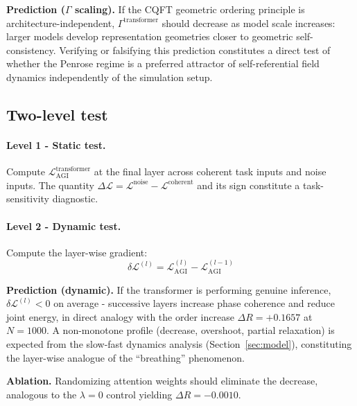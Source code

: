 \documentclass[12pt,a4paper]{article}
\theoremstyle{plain}
\theoremstyle{definition}
\begin{document}
\begin{keyresult}
\textbf{Prediction ($\Gamma$ scaling).} If the CQFT geometric ordering
principle is architecture-independent, $\Gamma^{\text{transformer}}$
should decrease as model scale increases: larger models develop
representation geometries closer to geometric self-consistency. Verifying
or falsifying this prediction constitutes a direct test of whether the
Penrose regime is a preferred attractor of self-referential field dynamics
independently of the simulation setup.
\end{keyresult}

\subsection{Two-level test}
\label{subsec:two_level}

\paragraph{Level 1 - Static test.}
Compute $\mathcal{L}_{\text{AGI}}^{\text{transformer}}$ at the final
layer across coherent task inputs and noise inputs. The quantity
$\Delta\mathcal{L} = \mathcal{L}^{\text{noise}} -
\mathcal{L}^{\text{coherent}}$ and its sign constitute a
task-sensitivity diagnostic.

\paragraph{Level 2 - Dynamic test.}
Compute the layer-wise gradient:
\begin{equation}
\label{eq:delta_L}
\delta\mathcal{L}^{(l)} = \mathcal{L}_{\text{AGI}}^{(l)}
                         - \mathcal{L}_{\text{AGI}}^{(l-1)}
\end{equation}

\begin{keyresult}
\textbf{Prediction (dynamic).} If the transformer is performing genuine
inference, $\delta\mathcal{L}^{(l)} < 0$ on average - successive
layers increase phase coherence and reduce joint energy, in direct
analogy with the order increase $\Delta R = +0.1657$ at $N = 1000$.
A non-monotone profile (decrease, overshoot, partial relaxation) is
expected from the slow-fast dynamics analysis
(Section~\ref{sec:model}), constituting the layer-wise analogue of the
``breathing'' phenomenon.

\textbf{Ablation.} Randomizing attention weights should eliminate the
decrease, analogous to the $\lambda = 0$ control yielding
$\Delta R = -0.0010$.
\end{keyresult}
\end{document}
